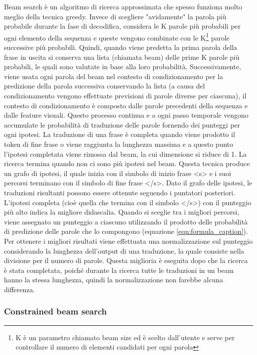 Beam search \cite{koehn2009statistical} è un algoritmo di ricerca approssimata che spesso funziona molto meglio della tecnica greedy.
Invece di scegliere "avidamente" la parola più probabile durante la fase di decodifica, considera le K parole più probabili per ogni elemento della sequenza e queste vengono combinate con le K\footnote{K è un parametro chiamato beam size ed è scelto dall'utente e serve per controllare il numero di elementi candidati per ogni parola} parole successive più probabili.
Quindi, quando viene predetta la prima parola della frase in uscita si conserva una lista (chiamata beam) delle prime K parole più probabili, le quali sono valutate in base alla loro probabilità. Successivamente, viene usata ogni parola del beam nel contesto di condizionamento per la predizione della parola successiva conservando la lista (a causa del condizionamento vengono effettuate previsioni di parole diverse per ciascuna), il contesto di condizionamento è composto dalle parole precedenti della sequenza e dalle feature visuali.  Questo processo continua e a ogni passo temporale vengono accumulate le probabilità di traduzione delle parole fornendo dei punteggi per ogni ipotesi. La traduzione di una frase è completa quando viene prodotto il token di fine frase o viene raggiunta la lunghezza massima e a questo punto l'ipotesi completata viene rimossa dal beam, la cui dimensione si riduce di 1. La ricerca termina quando non ci sono più ipotesi nel beam. Questa tecnica produce un grafo di ipotesi, il quale inizia con il simbolo di inizio frase <s> e i suoi percorsi terminano con il simbolo di fine frase </s>. Dato il grafo delle ipotesi, le traduzioni risultanti possono essere ottenute seguendo i puntatori posteriori. L'ipotesi completa (cioè quella che termina con il simbolo </s>) con il punteggio più alto indica la migliore didascalia. Quando si sceglie tra i migliori percorsi, viene assegnato un punteggio a ciascuno utilizzando il prodotto delle probabilità di predizione delle parole che lo compongono (equazione \ref{eqn:formula_caption}). Per ottenere i migliori risultati viene effettuata una normalizzazione sul punteggio considerando la lunghezza dell'output di una traduzione, la quale consiste nella divisione per il numero di parole. Questa miglioria è eseguita dopo che la ricerca è stata completata, poiché durante la ricerca tutte le traduzioni in un beam hanno la stessa lunghezza, quindi la normalizzazione non farebbe alcuna differenza.

\subsubsection{Constrained beam search}\label{constrained_beam_search}

